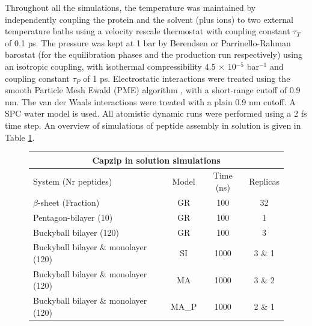 Throughout all the simulations, the temperature was maintained by independently coupling the protein and the solvent (plus ions) to two external temperature baths using a velocity rescale thermostat \cite{Bussi2007} with coupling constant $\tau _T$ of 0.1 ps. The pressure was kept at 1 bar by Berendsen \cite{Berendsen1984} or Parrinello-Rahman barostat \cite{Parrinello1981} (for the equilibration phases and the production run respectively) using an isotropic coupling, with isothermal compressibility 4.5 $\times$ 10$^{-5}$ bar$^{-1}$ and coupling constant $\tau_P$ of 1 ps. Electrostatic interactions were treated using the smooth Particle Mesh Ewald (PME) algorithm \cite{Essmann1995}, with a short-range cutoff of 0.9 nm. The van der Waals interactions were treated with a plain 0.9 nm cutoff. A SPC water model \cite{Berendsen1981} is used. All atomistic dynamic runs were performed using a 2 fs time step. An overview of simulations of peptide assembly in solution is given in Table \ref{table:sim_solution}.

\begin{figure}[t]
\centering
 \def\arraystretch{1.6}
\begin{tabular}{l|ccc}
 \multicolumn{4}{c}{\textbf{Capzip in solution simulations}} \\
 \hline
 System (Nr peptides) & Model & Time (ns) & Replicas \\
 \hline
 $\beta$-sheet (Fraction) & GR & 100 & 32 \\
 Pentagon-bilayer (10) & GR & 100 & 1 \\
 Buckyball bilayer (120) & GR & 100 & 3 \\
 Buckyball bilayer \& monolayer (120) & SI & 1000 & 3 \& 1 \\
 Buckyball bilayer \& monolayer (120) & MA & 1000 & 3 \& 2 \\
 Buckyball bilayer \& monolayer (120) & MA\_P & 1000 & 2 \& 1 \\
 \hline
 \end{tabular}
\label{table:sim_solution}
\end{figure}

